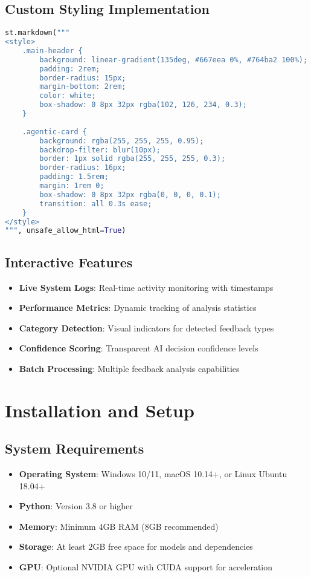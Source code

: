 \documentclass[11pt,a4paper]{article}
\begin{document}
\subsection{Custom Styling Implementation}
\begin{lstlisting}[style=code,language=Python]
st.markdown("""
<style>
    .main-header {
        background: linear-gradient(135deg, #667eea 0%, #764ba2 100%);
        padding: 2rem;
        border-radius: 15px;
        margin-bottom: 2rem;
        color: white;
        box-shadow: 0 8px 32px rgba(102, 126, 234, 0.3);
    }
    
    .agentic-card {
        background: rgba(255, 255, 255, 0.95);
        backdrop-filter: blur(10px);
        border: 1px solid rgba(255, 255, 255, 0.3);
        border-radius: 16px;
        padding: 1.5rem;
        margin: 1rem 0;
        box-shadow: 0 8px 32px rgba(0, 0, 0, 0.1);
        transition: all 0.3s ease;
    }
</style>
""", unsafe_allow_html=True)
\end{lstlisting}

\subsection{Interactive Features}
\begin{itemize}
  \item \textbf{Live System Logs}: Real-time activity monitoring with timestamps
  \item \textbf{Performance Metrics}: Dynamic tracking of analysis statistics
  \item \textbf{Category Detection}: Visual indicators for detected feedback types
  \item \textbf{Confidence Scoring}: Transparent AI decision confidence levels
  \item \textbf{Batch Processing}: Multiple feedback analysis capabilities
\end{itemize}

\section{Installation and Setup}

\subsection{System Requirements}
\begin{itemize}
  \item \textbf{Operating System}: Windows 10/11, macOS 10.14+, or Linux Ubuntu 18.04+
  \item \textbf{Python}: Version 3.8 or higher
  \item \textbf{Memory}: Minimum 4GB RAM (8GB recommended)
  \item \textbf{Storage}: At least 2GB free space for models and dependencies
  \item \textbf{GPU}: Optional NVIDIA GPU with CUDA support for acceleration
\end{itemize}
\end{document}

